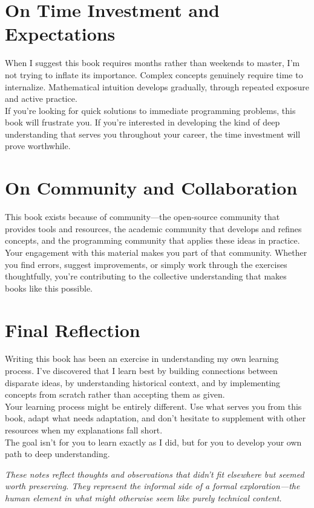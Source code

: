 \section*{On Time Investment and Expectations}

When I suggest this book requires months rather than weekends to master, I'm not trying to inflate its importance. Complex concepts genuinely require time to internalize. Mathematical intuition develops gradually, through repeated exposure and active practice.\\

If you're looking for quick solutions to immediate programming problems, this book will frustrate you. If you're interested in developing the kind of deep understanding that serves you throughout your career, the time investment will prove worthwhile.\\

\section*{On Community and Collaboration}

This book exists because of community—the open-source community that provides tools and resources, the academic community that develops and refines concepts, and the programming community that applies these ideas in practice.\\

Your engagement with this material makes you part of that community. Whether you find errors, suggest improvements, or simply work through the exercises thoughtfully, you're contributing to the collective understanding that makes books like this possible.\\

\section*{Final Reflection}

Writing this book has been an exercise in understanding my own learning process. I've discovered that I learn best by building connections between disparate ideas, by understanding historical context, and by implementing concepts from scratch rather than accepting them as given.\\

Your learning process might be entirely different. Use what serves you from this book, adapt what needs adaptation, and don't hesitate to supplement with other resources when my explanations fall short.\\

The goal isn't for you to learn exactly as I did, but for you to develop your own path to deep understanding.\\

\begin{flushright}
	\textit{These notes reflect thoughts and observations that didn't fit elsewhere but seemed worth preserving. They represent the informal side of a formal exploration—the human element in what might otherwise seem like purely technical content.}
\end{flushright}